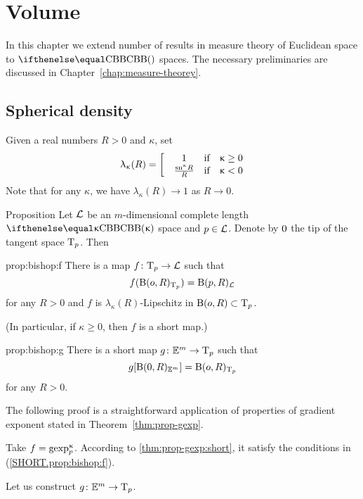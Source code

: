 
\chapter{Volume}

In this chapter we extend number of results in measure theory of Euclidean space 
to $\Alex{}$ spaces.
The necessary preliminaries are discussed in Chapter~\ref{chap:measure-theorey}.

\section{Spherical density}

Given a real numbers $R>0$ and $\kappa$, 
set 
\[
\lambda_\kappa(R)=
\left[
\begin{matrix}
&1&\text{if}&\kappa\ge 0
\\
&\frac{\sn\kappa R}{R}&\text{if}&\kappa< 0
\end{matrix}
\right.
\]
Note that for any $\kappa$, we have $\lambda_\kappa(R)\to 1$ as $R\to0$.

\begin{thm}{Proposition}\label{prop:bishop}
Let $\mathcal{L}$ be an $m$-dimensional complete length $\Alex\kappa$ space
and
$p\in\spc{L}$.
Denote by $0$ the tip of the tangent space $\text{\rm T}_p$.
Then

\begin{subthm}{prop:bishop:f}
There is a map $f\:\T_p\to \spc{L}$
such that
\[f(\mathrm{B}{}(o,R)_{\text{\rm T}_p})=\mathrm{B}{}(p,R)_{\mathcal{L}}\]
for any $R>0$
and
$f$ 
is $\lambda_\kappa(R)$-Lipschitz in $\oBall(o,R)\subset\T_p$.

(In particular, if $\kappa\ge 0$, then $f$ is a short map.)
\end{subthm}

\begin{subthm}{prop:bishop:g}
There is a short map $g\:\EE^m\to \T_p$
such that
\[g[\mathrm{B}{}(0,R)_{\mathbb{E}^m}]=\mathrm{B}{}(o,R)_{\text{\rm T}_p}\]
for any $R>0$.
\end{subthm}
\end{thm}

The following proof is 
a straightforward application of properties of gradient exponent
stated in Theorem~\ref{thm:prop-gexp}.


Take $f=\mathop{\rm gexp}\nolimits_p^{\upkappa}$.
According to \ref{thm:prop-gexp:short}, it satisfy the conditions in (\ref{SHORT.prop:bishop:f}).

Let us construct $g\:\EE^m\to \T_p$.


